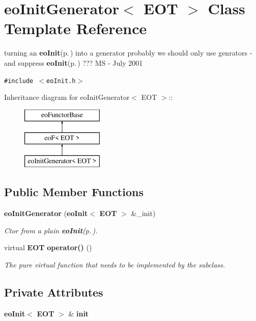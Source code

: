 \section{eo\-Init\-Generator$<$ EOT $>$ Class Template Reference}
\label{classeo_init_generator}
turning an {\bf eo\-Init}{\rm (p.\,\pageref{classeo_init})} into a generator probably we should only use genrators - and suppress {\bf eo\-Init}{\rm (p.\,\pageref{classeo_init})} ??? MS - July 2001  


{\tt \#include $<$eo\-Init.h$>$}

Inheritance diagram for eo\-Init\-Generator$<$ EOT $>$::\begin{figure}[H]
\begin{center}
\leavevmode
\includegraphics[height=3cm]{classeo_init_generator}
\end{center}
\end{figure}
\subsection*{Public Member Functions}
\begin{CompactItemize}
\item 
{\bf eo\-Init\-Generator} ({\bf eo\-Init}$<$ {\bf EOT} $>$ \&\_\-init)\label{classeo_init_generator_a0}

\begin{CompactList}\small\item\em Ctor from a plain {\bf eo\-Init}{\rm (p.\,\pageref{classeo_init})}. \item\end{CompactList}\item 
virtual {\bf EOT} {\bf operator()} ()\label{classeo_init_generator_a1}

\begin{CompactList}\small\item\em The pure virtual function that needs to be implemented by the subclass. \item\end{CompactList}\end{CompactItemize}
\subsection*{Private Attributes}
\begin{CompactItemize}
\item 
{\bf eo\-Init}$<$ {\bf EOT} $>$ \& {\bf init}\label{classeo_init_generator_r0}

\end{CompactItemize}


